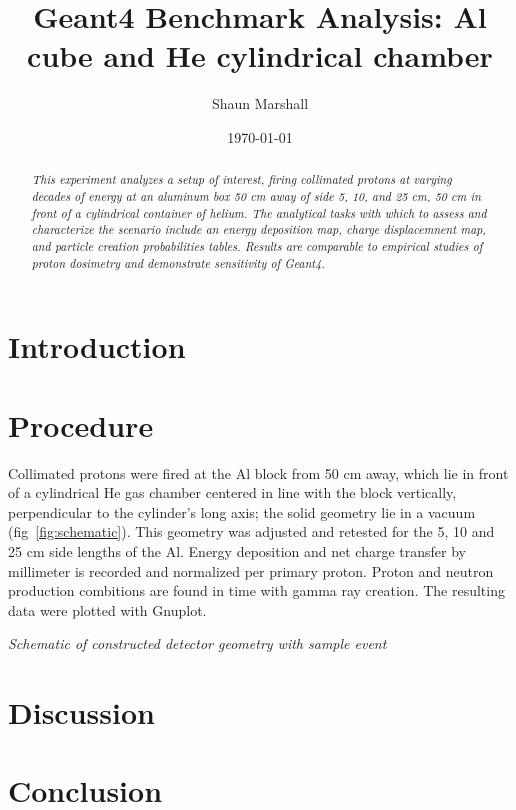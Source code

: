 \documentclass[11pt]{article}
\title{Geant4 Benchmark Analysis: Al cube and He cylindrical chamber}
\author{Shaun Marshall}
\date{\today}
\makeatletter
\newenvironment{figurehere}
{\def\@captype{figure}}
{}
\makeatother
\begin{document}
\maketitle

\begin{abstract}\emph{
This experiment analyzes a setup of interest, firing collimated protons at varying decades of energy at an aluminum box 50 cm away of side 5, 10, and 25 cm, 50 cm in front of a cylindrical container of helium.  The analytical tasks with which to assess and characterize the scenario include an energy deposition map, charge displacemnent map, and particle creation probabilities tables.  Results are comparable to empirical studies of proton dosimetry and demonstrate sensitivity of Geant4.
}\end{abstract}

\begin{multicols}{2}

\section{Introduction}

\section{Procedure}

Collimated protons were fired at the Al block from 50 cm away, which lie in front of a cylindrical He gas chamber centered in line with the block vertically, perpendicular to the cylinder's long axis; the solid geometry lie in a vacuum (fig~\ref{fig:schematic}).  This geometry was adjusted and retested for the 5, 10 and 25 cm side lengths  of the Al.  Energy deposition and net charge transfer by millimeter is recorded and normalized per primary proton.  Proton and neutron production combitions are found in time with gamma ray creation.  The resulting data were plotted with Gnuplot.

\begin{figurehere}
\centering
{}
\caption{\label{fig:schematic}\small \emph{Schematic of constructed detector geometry with sample event}}
\end{figurehere}

\section{Discussion}

\section{Conclusion}

\end{multicols}
\end{document}
